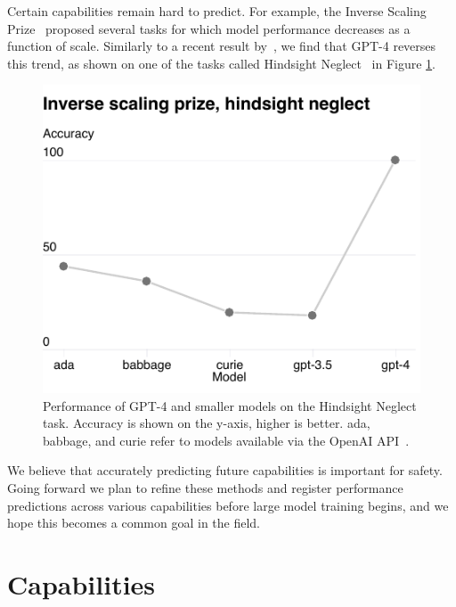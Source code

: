 \documentclass{article}
\begin{document}
Certain capabilities remain hard to predict. For example, the Inverse
Scaling Prize~\citep{mckenzie2022inverse} proposed several tasks for which model performance decreases as a function of scale. Similarly to a recent result by~\citet{wei2022inverse}, we find that GPT-4 reverses this trend, as shown on one of the tasks called Hindsight Neglect~\citep{mckenzie2022round1} in Figure \ref{fig:inverse_scaling}.

\begin{figure}[htbp]
    \centering
    \includegraphics[width=0.5\linewidth]{assets/inverse_scaling}
    \caption{Performance of GPT-4 and smaller models on the Hindsight Neglect task. Accuracy is shown on the y-axis, higher is better. ada, babbage, and curie refer to models available via the OpenAI API~\cite{openaiapiblog}.}
    \label{fig:inverse_scaling}
\end{figure}


We believe that accurately predicting future capabilities is important for safety. Going forward we plan to refine these methods and register performance predictions across various capabilities before large model training begins, and we hope this becomes a common goal in the field.

\section{Capabilities}
\end{document}
